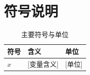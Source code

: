 \section{符号说明}
\begin{table}[!htbp]\centering
\caption{主要符号与单位}\label{tab:symbols}
\begin{tabular}{lll}\toprule
符号 & 含义 & 单位\\\midrule
$x$ & [变量含义] & [单位]\\\bottomrule
\end{tabular}
\end{table}
